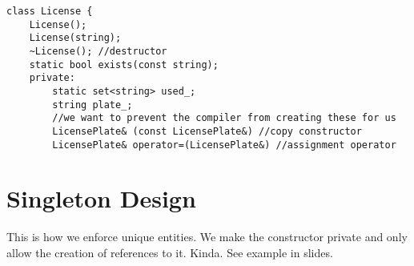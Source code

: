 \documentclass[12pt]{article}
\begin{document}
\begin{verbatim}
class License {
    License();
    License(string);
    ~License(); //destructor
    static bool exists(const string);
    private:
        static set<string> used_;
        string plate_;
        //we want to prevent the compiler from creating these for us
        LicensePlate& (const LicensePlate&) //copy constructor
        LicensePlate& operator=(LicensePlate&) //assignment operator
\end{verbatim}

\section*{Singleton Design}
This is how we enforce unique entities. We make the constructor private and only allow the creation of references to it. Kinda. See example in slides.
\end{document}
